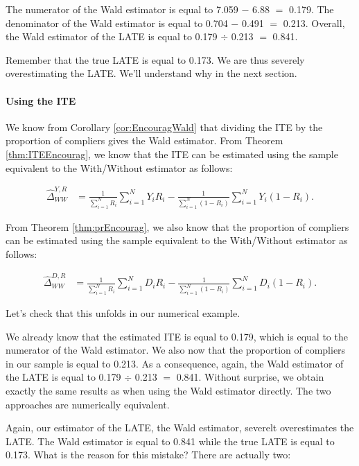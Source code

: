 \documentclass[]{book}
\let\oldparagraph\paragraph
\renewcommand{\paragraph}[1]{\oldparagraph{#1}\mbox{}}
\theoremstyle{definition}
\theoremstyle{definition}
\theoremstyle{definition}
\theoremstyle{remark}
\let\BeginKnitrBlock\begin \let\EndKnitrBlock\end
\begin{document}
The numerator of the Wald estimator is equal to 7.059 \(-\) 6.88 \(=\)
0.179. The denominator of the Wald estimator is equal to 0.704 \(-\)
0.491 \(=\) 0.213. Overall, the Wald estimator of the LATE is equal to
0.179 \(\div\) 0.213 \(=\) 0.841.

Remember that the true LATE is equal to 0.173. We are thus severely
overestimating the LATE. We'll understand why in the next section.

\paragraph{Using the ITE}\label{using-the-ite}

We know from Corollary \ref{cor:EncouragWald} that dividing the ITE by
the proportion of compliers gives the Wald estimator. From Theorem
\ref{thm:ITEEncourag}, we know that the ITE can be estimated using the
sample equivalent to the With/Without estimator as follows:

\begin{align*}
\hat{\Delta}^{Y,R}_{WW} & = \frac{1}{\sum_{i=1}^N R_i}\sum_{i=1}^N Y_iR_i-\frac{1}{\sum_{i=1}^N (1-R_i)}\sum_{i=1}^N Y_i(1-R_i).
\end{align*}

From Theorem \ref{thm:prEncourag}, we also know that the proportion of
compliers can be estimated using the sample equivalent to the
With/Without estimator as follows:

\begin{align*}
\hat{\Delta}^{D,R}_{WW} & = \frac{1}{\sum_{i=1}^N R_i}\sum_{i=1}^N D_iR_i-\frac{1}{\sum_{i=1}^N (1-R_i)}\sum_{i=1}^N D_i(1-R_i).
\end{align*}

\BeginKnitrBlock{example}
\protect\hypertarget{exm:unnamed-chunk-122}{}{\label{exm:unnamed-chunk-122}
}Let's check that this unfolds in our numerical example.
\EndKnitrBlock{example} We already know that the estimated ITE is equal
to 0.179, which is equal to the numerator of the Wald estimator. We also
now that the proportion of compliers in our sample is equal to 0.213. As
a consequence, again, the Wald estimator of the LATE is equal to 0.179
\(\div\) 0.213 \(=\) 0.841. Without surprise, we obtain exactly the same
results as when using the Wald estimator directly. The two approaches
are numerically equivalent.

Again, our estimator of the LATE, the Wald estimator, severelt
overestimates the LATE. The Wald estimator is equal to 0.841 while the
true LATE is equal to 0.173. What is the reason for this mistake? There
are actually two:
\end{document}
